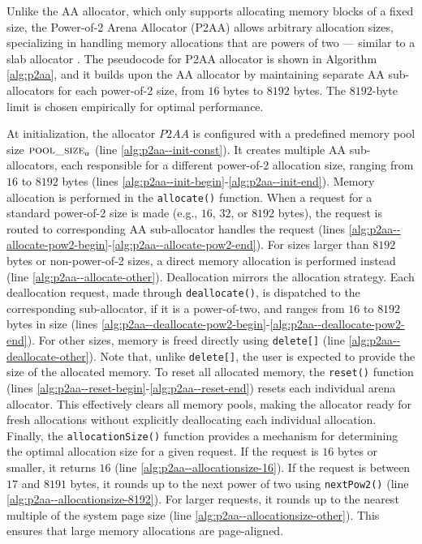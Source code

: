 Unlike the AA allocator, which only supports allocating memory blocks of a fixed size, the Power-of-2 Arena Allocator (P2AA) allows arbitrary allocation sizes, specializing in handling memory allocations that are powers of two --- similar to a slab allocator \cite{bonwick1994slab}. The pseudocode for P2AA allocator is shown in Algorithm \ref{alg:p2aa}, and it builds upon the AA allocator by maintaining separate AA sub-allocators for each power-of-2 size, from $16$ bytes to $8192$ bytes. The $8192$-byte limit is chosen empirically for optimal performance.



At initialization, the allocator $P2AA$ is configured with a predefined memory pool size $\textsc{pool\_size}_a$ (line \ref{alg:p2aa--init-const}). It creates multiple AA sub-allocators, each responsible for a different power-of-2 allocation size, ranging from $16$ to $8192$ bytes (lines \ref{alg:p2aa--init-begin}-\ref{alg:p2aa--init-end}). Memory allocation is performed in the \texttt{allocate()} function. When a request for a standard power-of-2 size is made (e.g., $16$, $32$, or $8192$ bytes), the request is routed to corresponding AA sub-allocator handles the request (lines \ref{alg:p2aa--allocate-pow2-begin}-\ref{alg:p2aa--allocate-pow2-end}). For sizes larger than $8192$ bytes or non-power-of-2 sizes, a direct memory allocation is performed instead (line \ref{alg:p2aa--allocate-other}). Deallocation mirrors the allocation strategy. Each deallocation request, made through \texttt{deallocate()}, is dispatched to the corresponding sub-allocator, if it is a power-of-two, and ranges from $16$ to $8192$ bytes in size (lines \ref{alg:p2aa--deallocate-pow2-begin}-\ref{alg:p2aa--deallocate-pow2-end}). For other sizes, memory is freed directly using \texttt{delete[]} (line \ref{alg:p2aa--deallocate-other}). Note that, unlike \texttt{delete[]}, the user is expected to provide the size of the allocated memory. To reset all allocated memory, the \texttt{reset()} function (lines \ref{alg:p2aa--reset-begin}-\ref{alg:p2aa--reset-end}) resets each individual arena allocator. This effectively clears all memory pools, making the allocator ready for fresh allocations without explicitly deallocating each individual allocation. Finally, the \texttt{allocationSize()} function provides a mechanism for determining the optimal allocation size for a given request. If the request is $16$ bytes or smaller, it returns $16$ (line \ref{alg:p2aa--allocationsize-16}). If the request is between $17$ and $8191$ bytes, it rounds up to the next power of two using \texttt{nextPow2()} (line \ref{alg:p2aa--allocationsize-8192}). For larger requests, it rounds up to the nearest multiple of the system page size (line \ref{alg:p2aa--allocationsize-other}). This ensures that large memory allocations are page-aligned.


